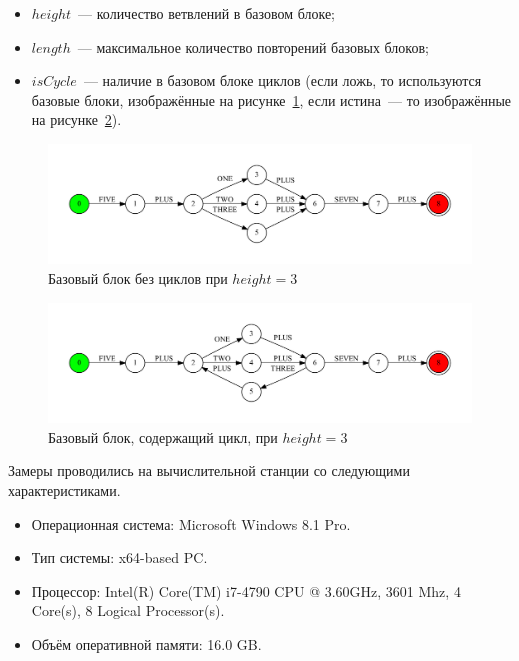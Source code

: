 \begin{itemize}
  \item $height$~--- количество ветвлений в базовом блоке;
  \item $length$~--- максимальное количество повторений базовых блоков;
  \item $isCycle$~--- наличие в базовом блоке циклов (если ложь, то используются базовые блоки, изображённые на рисунке~\ref{block}, если истина~--- то изображённые на рисунке~\ref{block_loop}).
\end{itemize}

\begin{figure}[h!]
 \centering
 \includegraphics[width=15cm]{pics/block.pdf}
 \caption{Базовый блок без циклов при $height=3$}
 \label{block}
\end{figure}

\begin{figure}[h!]
 \centering
 \includegraphics[width=15cm]{pics/block_loop.pdf}
 \caption{Базовый блок, содержащий цикл, при $height=3$}
 \label{block_loop}
\end{figure}

Замеры проводились на вычислительной станции со следующими характеристиками.
\begin{itemize}
\item Операционная система: Microsoft Windows 8.1 Pro.
\item Тип системы: x64-based PC.
\item Процессор: Intel(R) Core(TM) i7-4790 CPU @ 3.60GHz, 3601 Mhz, 4 Core(s), 8 Logical Processor(s).
\item Объём оперативной памяти: 16.0 GB.
\end{itemize}

